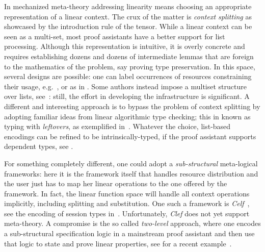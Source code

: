 
In mechanized meta-theory addressing linearity means choosing an
appropriate representation of a linear context. The crux of the matter
is \emph{context splitting} as showcased by the introduction rule of
the tensor. While a linear context can be seen as a multi-set, most
proof assistants have a better support for list processing.  Although
this representation is intuitive, it is overly concrete and requires
establishing dozens and dozens of intermediate lemmas that are foreign
to the mathematics of the problem, say proving type preservation. In
this space, several designs are possible: one can label occurrences of
resources constraining their usage, e.g.~\cite{CicconeP20}, or
 as in \cite{Castro2020}. Some authors
instead impose a multiset structure over lists,
see~\cite{ChaudhuriLR19,Danielsson12}: still, the effort in developing
the infrastructure is significant. A different and interesting
approach is to bypass the problem of context splitting by adopting
familiar ideas from linear algorithmic  type checking;
this in known as typing with \emph{leftovers}, as
exemplified in~\cite{DBLP:conf/forte/ZalakainD21}. Whatever the choice,
list-based encodings can be refined to be intrinsically-typed, if the proof assistant supports dependent types, see \cite{Thiemann2019,CicconeP20,RouvoetPKV20}.

For something completely different, one could adopt a
\emph{sub-structural} meta-logical frameworks: here it is the framework
itself that handles resource distribution and the user just has to map
her linear operations to the one offered by the framework. In fact,
the linear function space will handle all context operations
implicitly, including splitting and substitution. One such a framework
is \emph{Celf}~\cite{Schack-Nielsen:IJCAR08}, see the encoding of
session types in~\cite{Bock2016}. Unfortunately, \emph{Clef} does not
yet support meta-theory. A compromise is the so called
\emph{two-level} approach, where one encodes a sub-structural
specification logic in a mainstream proof assistant and then use that
logic to state and prove linear properties, see for a recent
example~\cite{Felty:MSCS21}.



